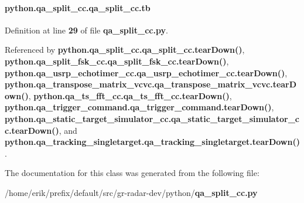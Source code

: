 \paragraph[{tb}]{\setlength{\rightskip}{0pt plus 5cm}python.\+qa\+\_\+split\+\_\+cc.\+qa\+\_\+split\+\_\+cc.\+tb}\label{classpython_1_1qa__split__cc_1_1qa__split__cc_afd7d3c905873acddad726a1af3b8a0ce}


Definition at line {\bf 29} of file {\bf qa\+\_\+split\+\_\+cc.\+py}.



Referenced by {\bf python.\+qa\+\_\+split\+\_\+cc.\+qa\+\_\+split\+\_\+cc.\+tear\+Down()}, {\bf python.\+qa\+\_\+split\+\_\+fsk\+\_\+cc.\+qa\+\_\+split\+\_\+fsk\+\_\+cc.\+tear\+Down()}, {\bf python.\+qa\+\_\+usrp\+\_\+echotimer\+\_\+cc.\+qa\+\_\+usrp\+\_\+echotimer\+\_\+cc.\+tear\+Down()}, {\bf python.\+qa\+\_\+transpose\+\_\+matrix\+\_\+vcvc.\+qa\+\_\+transpose\+\_\+matrix\+\_\+vcvc.\+tear\+Down()}, {\bf python.\+qa\+\_\+ts\+\_\+fft\+\_\+cc.\+qa\+\_\+ts\+\_\+fft\+\_\+cc.\+tear\+Down()}, {\bf python.\+qa\+\_\+trigger\+\_\+command.\+qa\+\_\+trigger\+\_\+command.\+tear\+Down()}, {\bf python.\+qa\+\_\+static\+\_\+target\+\_\+simulator\+\_\+cc.\+qa\+\_\+static\+\_\+target\+\_\+simulator\+\_\+cc.\+tear\+Down()}, and {\bf python.\+qa\+\_\+tracking\+\_\+singletarget.\+qa\+\_\+tracking\+\_\+singletarget.\+tear\+Down()}.



The documentation for this class was generated from the following file\+:\begin{DoxyCompactItemize}
\item 
/home/erik/prefix/default/src/gr-\/radar-\/dev/python/{\bf qa\+\_\+split\+\_\+cc.\+py}\end{DoxyCompactItemize}
